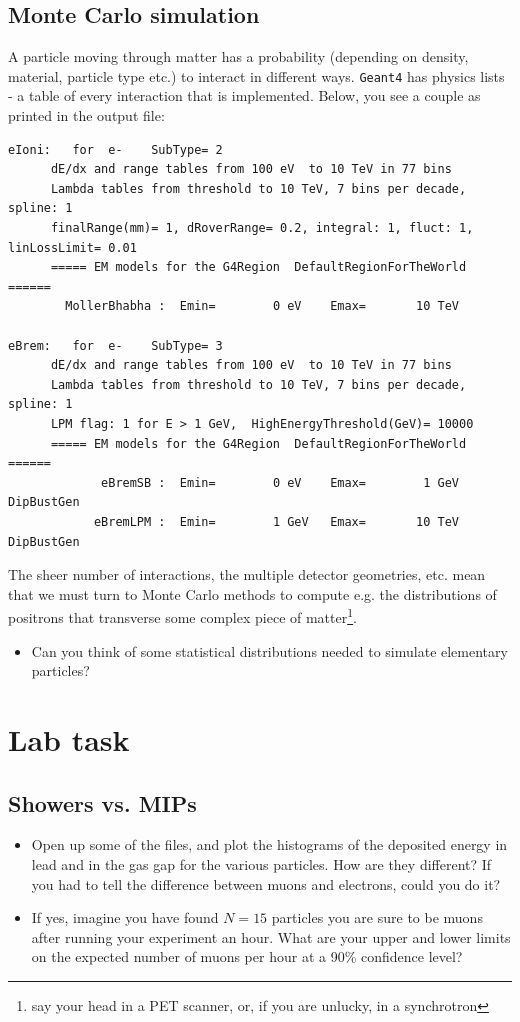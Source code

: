 \documentclass[11pt,a4paper]{exam}
\begin{document}
\subsection{Monte Carlo simulation}
A particle moving through matter has a probability (depending on density, material, particle type  etc.) to interact in different ways. \texttt{Geant4} has physics lists - a table of every interaction that is implemented. Below, you see a couple as printed in the output file: 
\begin{lstlisting}
eIoni:   for  e-    SubType= 2
      dE/dx and range tables from 100 eV  to 10 TeV in 77 bins
      Lambda tables from threshold to 10 TeV, 7 bins per decade, spline: 1
      finalRange(mm)= 1, dRoverRange= 0.2, integral: 1, fluct: 1, linLossLimit= 0.01
      ===== EM models for the G4Region  DefaultRegionForTheWorld ======
        MollerBhabha :  Emin=        0 eV    Emax=       10 TeV

eBrem:   for  e-    SubType= 3
      dE/dx and range tables from 100 eV  to 10 TeV in 77 bins
      Lambda tables from threshold to 10 TeV, 7 bins per decade, spline: 1
      LPM flag: 1 for E > 1 GeV,  HighEnergyThreshold(GeV)= 10000
      ===== EM models for the G4Region  DefaultRegionForTheWorld ======
             eBremSB :  Emin=        0 eV    Emax=        1 GeV   DipBustGen
            eBremLPM :  Emin=        1 GeV   Emax=       10 TeV   DipBustGen
\end{lstlisting}
The sheer number of interactions, the multiple detector geometries, etc. mean that we must turn to Monte Carlo
methods to compute e.g. the distributions of positrons that transverse some complex piece of matter\footnote{say your head in a PET scanner, or, if you are unlucky, in a synchrotron}.

\begin{itemize}
\item Can you think of some statistical distributions needed to simulate elementary particles?
\end{itemize}

\section{Lab task}
\subsection{Showers vs. MIPs}
\begin{itemize}
    \item Open up some of the files, and plot the histograms of the deposited energy in lead and in the gas gap for the various particles. How are they different? If you had to tell the difference between muons and electrons, could you do it? 
    \item If yes, imagine you have found $N=15$ particles you are sure to be muons after running your experiment an hour. What are your upper and lower limits on the expected number of muons per hour at a 90\% confidence level?
\end{itemize}
\end{document}
